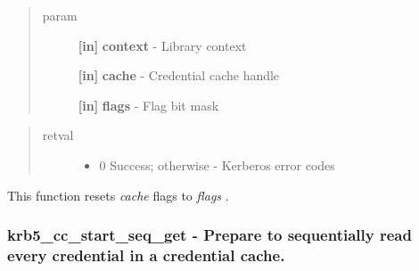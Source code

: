 \documentclass[letterpaper,10pt,english]{sphinxmanual}
\begin{document}
\begin{fulllineitems}
\label{appdev/refs/api/krb5_cc_set_flags:krb5_cc_set_flags}
\end{fulllineitems}

\begin{quote}\begin{description}
\item[{param}] \leavevmode
\textbf{{[}in{]}} \textbf{context} - Library context

\textbf{{[}in{]}} \textbf{cache} - Credential cache handle

\textbf{{[}in{]}} \textbf{flags} - Flag bit mask

\end{description}\end{quote}
\begin{quote}\begin{description}
\item[{retval}] \leavevmode\begin{itemize}
\item {} 
0   Success; otherwise - Kerberos error codes

\end{itemize}

\end{description}\end{quote}

This function resets \emph{cache} flags to \emph{flags} .


\subsubsection{krb5\_cc\_start\_seq\_get -  Prepare to sequentially read every credential in a credential cache.}
\label{appdev/refs/api/krb5_cc_start_seq_get::doc}\label{appdev/refs/api/krb5_cc_start_seq_get:krb5-cc-start-seq-get-prepare-to-sequentially-read-every-credential-in-a-credential-cache}

\begin{fulllineitems}
\label{appdev/refs/api/krb5_cc_start_seq_get:krb5_cc_start_seq_get}
\end{fulllineitems}
\end{document}
